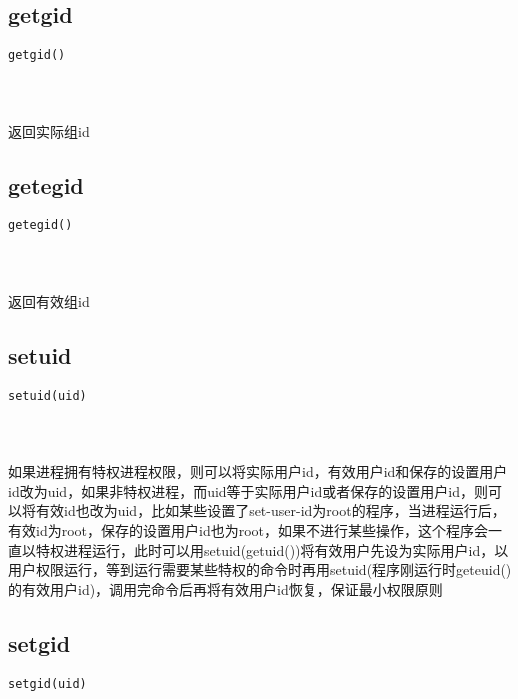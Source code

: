 \documentclass[10pt,a4paper]{article}
\begin{document}
\subsection{getgid}
\begin{spacing}{2.0}
\lstset{language=C,numbers=none}
\begin{lstlisting}
getgid()
\end{lstlisting}
\paragraph{ \ \ }返回实际组id
\end{spacing}

\subsection{getegid}
\begin{spacing}{2.0}
\lstset{language=C,numbers=none}
\begin{lstlisting}
getegid()
\end{lstlisting}
\paragraph{ \ \ }返回有效组id
\end{spacing}

\subsection{setuid}
\begin{spacing}{2.0}
\lstset{language=C,numbers=none}
\begin{lstlisting}
setuid(uid)
\end{lstlisting}
{\large\color[rgb]{0.2,0.4,0.6}{uid:}}
\paragraph{ \ \ }如果进程拥有特权进程权限，则可以将实际用户id，有效用户id和保存的设置用户id改为uid，如果非特权进程，而uid等于实际用户id或者保存的设置用户id，则可以将有效id也改为uid，比如某些设置了set-user-id为root的程序，当进程运行后，有效id为root，保存的设置用户id也为root，如果不进行某些操作，这个程序会一直以特权进程运行，此时可以用setuid(getuid())将有效用户先设为实际用户id，以用户权限运行，等到运行需要某些特权的命令时再用setuid(程序刚运行时geteuid()的有效用户id)，调用完命令后再将有效用户id恢复，保证最小权限原则
\end{spacing}

\subsection{setgid}
\begin{spacing}{2.0}
\lstset{language=C,numbers=none}
\begin{lstlisting}
setgid(uid)
\end{lstlisting}
{\large\color[rgb]{0.2,0.4,0.6}{uid:}}
\paragraph{ \ \ }
\end{spacing}
\end{document}
